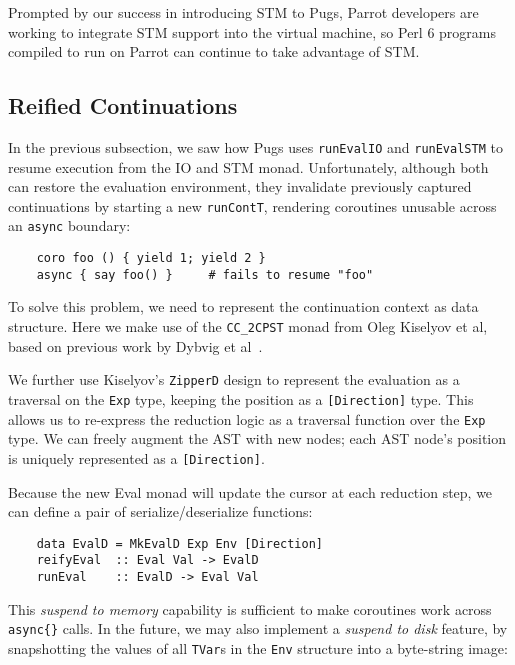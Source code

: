 \documentclass[]{sigplanconf}
\newcommand{\code}[1]{\texttt{#1}}
\begin{document}
Prompted by our success in introducing STM to Pugs, Parrot developers are
working to integrate STM support into the virtual machine, so Perl 6 programs
compiled to run on Parrot can continue to take advantage of STM.

\subsection{Reified Continuations}
\label{sec:ReifiedContinuations}

In the previous subsection, we saw how Pugs uses \code{runEvalIO} and
\code{runEvalSTM} to resume execution from the IO and STM monad.
Unfortunately, although both can restore the evaluation environment,
they invalidate previously captured continuations by starting a new
\code{runContT}, rendering coroutines unusable across an \code{async} boundary:

\begin{lstlisting}
    coro foo () { yield 1; yield 2 }
    async { say foo() }     # fails to resume "foo"
\end{lstlisting}

To solve this problem, we need to represent the continuation context as data
structure.  Here we make use of the \code{CC\_2CPST} monad from Oleg Kiselyov
et al, based on previous work by Dybvig et al~\cite{Dybvig}.

We further use Kiselyov's \code{ZipperD} design to represent the evaluation as
a traversal on the \code{Exp} type, keeping the position as a
\code{[Direction]} type.  This allows us to re-express the reduction logic as a
traversal function over the \code{Exp} type. We can freely augment the AST with
new nodes; each AST node's position is uniquely represented as a
\code{[Direction]}.

Because the new Eval monad will update the cursor at each reduction step, we can
define a pair of serialize/deserialize functions:

\begin{lstlisting}
    data EvalD = MkEvalD Exp Env [Direction]
    reifyEval  :: Eval Val -> EvalD
    runEval    :: EvalD -> Eval Val
\end{lstlisting}

This \emph{suspend to memory} capability is sufficient to make coroutines work across
\code{async\{\}} calls.  In the future, we may also implement a \emph{suspend
to disk} feature, by snapshotting the values of all \code{TVar}s in the
\code{Env} structure into a byte-string image:
\end{document}
